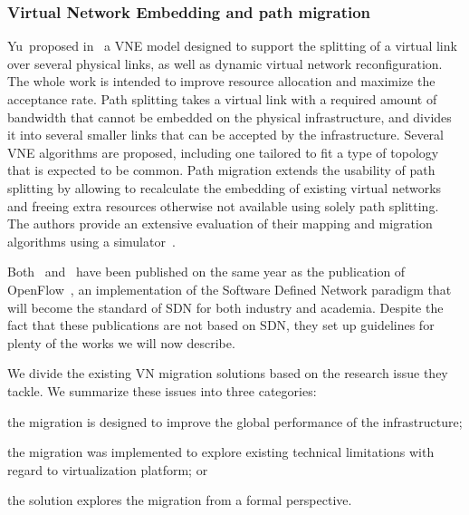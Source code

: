 \subsubsection{Virtual Network Embedding and path migration}
Yu~\etal proposed in~\cite{VNE-Yu2008} a VNE model designed to support the splitting of a virtual link over several physical links, as well as dynamic virtual network reconfiguration.
The whole work is intended to improve resource allocation and maximize the acceptance rate. 
Path splitting takes a virtual link with a required amount of bandwidth that cannot be embedded on the physical infrastructure, and divides it into several smaller links that can be accepted by the infrastructure.
Several VNE algorithms are proposed, including one tailored to fit a type of topology that is expected to be common.
Path migration extends the usability of path splitting by allowing to recalculate the embedding of existing virtual networks and freeing extra resources otherwise not available using solely path splitting.
The authors provide an extensive evaluation of their mapping and migration algorithms using a simulator~\cite{vnesimulator}.

Both~\cite{VROOM-Wang2008} and~\cite{VNE-Yu2008} have been published on the same year as the publication of OpenFlow~\cite{Openflow-McKeown2008}, an implementation of the Software Defined Network paradigm that will become the standard of SDN for both industry and academia.
Despite the fact that these publications are not based on SDN, they set up guidelines for plenty of the works we will now describe.

We divide the existing VN migration solutions based on the research issue they tackle.
We summarize these issues into three categories: 
\begin{inparaenum}[i)] 
\item the migration is designed to improve the global performance of the infrastructure;
\item the migration was implemented to explore existing technical limitations with regard to virtualization platform; or 
\item the solution explores the migration from a formal perspective.
\end{inparaenum}

